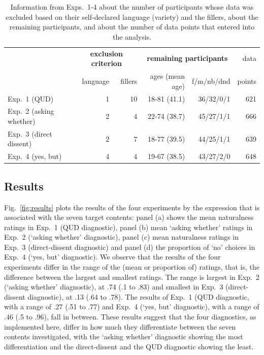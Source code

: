 \documentclass[times,linguex,xcolor]{glossa}
\begin{document}
      \begin{table}[h!]
        \centering
        \begin{tabular}{l | r r | r r  | r }
                     & \multicolumn{2}{c|}{\bf exclusion criterion} & \multicolumn{2}{c|}{\bf remaining participants} & data \\ 
                    & language & fillers & ages (mean age) & f/m/nb/dnd &  points \\ \hline
        Exp.~1 (QUD)   & 1 &  10 &  18-81 (41.1) & 36/32/0/1 & 621 \\ 
        Exp.~2 (asking whether) &  2 &  4 & 22-74 (38.7) & 45/27/1/1 & 666 \\ 
        Exp.~3  (direct dissent) &  2 &  7 & 18-77 (39.5) & 44/25/1/1  & 639 \\ 
        Exp.~4  (yes, but) & 4 & 4 & 19-67 (38.5)  & 43/27/2/0 & 648 \\ 
        \hline
        \end{tabular}
        \caption{Information from Exps.~1-4 about the number of participants whose data was excluded based on their self-declared language (variety) and the fillers, about the remaining participants, and about the number of data points that entered into the analysis.}\label{t:excluded}
      \end{table}

  \subsection{Results}
    Fig.~\ref{fig:results} plots the results of the four experiments by the expression that is associated with the seven target contents: panel (a) shows the mean naturalness ratings in Exp.~1 (QUD diagnostic), panel (b) mean `asking whether' ratings in Exp.~2 (`asking whether' diagnostic), panel (c) mean naturalness ratings in Exp.~3 (direct-dissent diagnostic) and panel (d) the proportion of `no' choices in Exp.~4 (`yes, but' diagnostic). We observe that the results of the four experiments differ in the range of the (mean or proportion of) ratings, that is, the difference between the largest and smallest ratings. The range is largest in Exp.~2 (`asking whether' diagnostic), at .74 (.1 to .83) and smallest in Exp.~3 (direct-dissent diagnostic), at .13 (.64 to .78). The results of Exp.~1 (QUD diagnostic, with a range of .27 (.51 to .77) and Exp.~4 (`yes, but' diagnostic), with a range of .46 (.5 to .96), fall in between. These results suggest that the four diagnostics, as implemented here, differ in how much they differentiate between the seven contents investigated, with the `asking whether' diagnostic showing the most differentiation and the direct-dissent and the QUD diagnostic showing the least.
\end{document}
